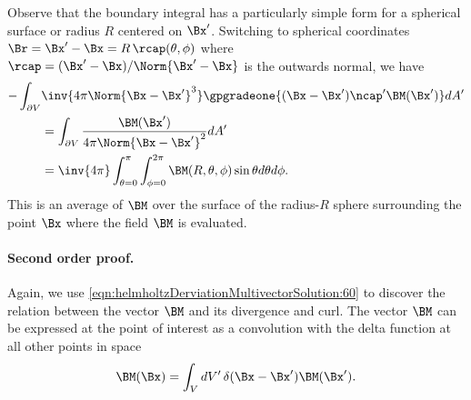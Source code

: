 Observe that the boundary integral has a particularly simple form for a spherical surface or radius \( R \) centered on \( \Bx' \).
Switching to spherical coordinates \( \Br = \Bx' - \Bx = R\, \rcap(\theta, \phi) \) where \( \rcap = (\Bx' - \Bx)/\Norm{\Bx' - \Bx} \) is the outwards normal, we have
\begin{equation}\label{eqn:helmholtzDerviationMultivectorSolution:840}
\begin{aligned}
-
\int_{\partial V} &
\inv{4 \pi \Norm{\Bx - \Bx'}^3 }
\gpgradeone{ (\Bx - \Bx') \ncap' \BM(\Bx') } dA' \\
&= \int_{\partial V} \frac{\BM(\Bx')}{4 \pi \Norm{\Bx - \Bx'}^2 } dA' \\
&= \inv{4\pi} \int_{\theta = 0}^\pi \int_{\phi = 0}^{2 \pi} \BM(R, \theta, \phi) \sin\theta d\theta d\phi.
\end{aligned}
\end{equation}
This is an average of \( \BM \) over the surface of the radius-\(R\) sphere surrounding the point \( \Bx \) where the field \( \BM \) is evaluated.

\paragraph{Second order proof.}

%
%
%

Again, we use \cref{eqn:helmholtzDerviationMultivectorSolution:60}
to discover the relation between the vector \( \BM \) and its divergence and curl.
The vector \( \BM \) can be expressed at the point of interest as a convolution with the delta function at all other points in space
\begin{equation}\label{eqn:helmholtzDerviationMultivectorSolution:80}
\BM(\Bx) = \int_V dV'\, \delta(\Bx - \Bx') \BM(\Bx').
\end{equation}

